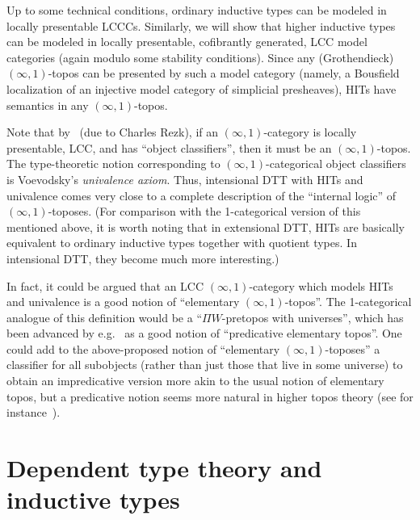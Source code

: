 \documentclass{amsart}
\begin{document}
Up to some technical conditions, ordinary inductive types can be modeled in locally presentable LCCCs.  Similarly, we will show that higher inductive types can be modeled in locally presentable, cofibrantly generated, LCC model categories (again modulo some stability conditions).
Since any (Grothendieck) $(\infty,1)$-topos can be presented by such a model category (namely, a Bousfield localization of an injective model category of simplicial presheaves), HITs have semantics in any $(\infty,1)$-topos.  

Note that by~\cite[6.1.6.8]{lurie:higher-topoi} (due to Charles Rezk), if an $(\infty,1)$-category is locally presentable, LCC, and has ``object classifiers'', then it must be an $(\infty,1)$-topos.
The type-theoretic notion corresponding to $(\infty,1)$-categorical object classifiers is Voevodsky's \emph{univalence axiom}.  
Thus, intensional DTT with HITs and univalence comes very close to a complete description of the ``internal logic'' of $(\infty,1)$-toposes.
(For comparison with the 1-categorical version of this mentioned above, it is worth noting that in extensional DTT, HITs are basically equivalent to ordinary inductive types together with quotient types.
In intensional DTT, they become much more interesting.)

In fact, it could be argued that an LCC $(\infty,1)$-category which models HITs and univalence is a good notion of ``elementary $(\infty,1)$-topos''.
The 1-categorical analogue of this definition would be a ``$\Pi W$-pretopos with universes'', which has been advanced by e.g.~\cite{mp:ttcst} as a good notion of ``predicative elementary topos''.
One could add to the above-proposed notion of ``elementary $(\infty,1)$-toposes'' a classifier for all subobjects (rather than just those that live in some universe) to obtain an impredicative version more akin to the usual notion of elementary topos, but a predicative notion seems more natural in higher topos theory (see for instance~\cite{predicativist}).

\section{Dependent type theory and inductive types}
\label{sec:type-theory}
\end{document}
